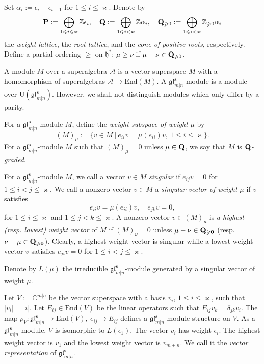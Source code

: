 \documentclass[11pt,reqno]{amsart}
\numberwithin{equation}{section}
\theoremstyle{definition}
\theoremstyle{remark}
\newcommand{\h}{\mathfrak{h}}
\newcommand{\End}{\mathrm{End}}
\newcommand{\bC}{\mathbb{C}}
\newcommand{\bZ}{\mathbb{Z}}
\newcommand{\gge}{\geqslant}
\newcommand{\lle}{\leqslant}
\newcommand{\glMN}{\mathfrak{gl}_{m|n}^{\bm s}}
\newcommand{\ka}{\varkappa}
\begin{document}
Set $\alpha_i:=\epsilon_i-\epsilon_{i+1}$ for $1\lle i \lle \ka$. Denote by
$$
{\bf P}:=\bigoplus_{1\lle i \lle \ka}\bZ \epsilon_i,\quad  {\bf Q}:=\bigoplus_{1\lle i < \ka}\bZ \alpha_i,\quad {\bf Q}_{\gge 0}:=\bigoplus_{1\lle i <\ka}\bZ_{\gge 0} \alpha_i$$ the \textit{weight lattice}, the \textit{root lattice}, and the \textit{cone of positive roots}, respectively. Define a partial ordering $\gge$ on $\h^*$: $\mu\gge \nu$ if $\mu-\nu\in {\bf Q}_{\gge 0}$.

A module $M$ over a superalgebra $\mathcal A$ is a vector superspace $M$ with a homomorphism of superalgebras $\mathcal A\to \End(M)$. A $\glMN$-module is a module over $\mathrm{U}(\glMN)$. However, we shall not distinguish modules which only differ by a parity.

For a $\glMN$-module $M$, define the \textit{weight subspace of weight} $\mu$ by
\begin{equation}\label{eq:uweight-space}
(M)_{\mu}:=\{v\in M\ \vert \ e_{ii}v=\mu(e_{ii})v,\ 1\lle i \lle \ka\}.
\end{equation}
For a $\glMN$-module $M$ such that $(M)_{\mu}=0$ unless $\mu\in\bf Q$, we say that $M$ is \textit{$\bf Q$-graded}.

For a $\glMN$-module $M$, we call a vector $v\in M$ \textit{singular} if $e_{ij}v=0$ for $1\lle i<j\lle \ka$. We call a nonzero vector $v\in M$ a \textit{singular vector of weight} $\mu$ if $v$ satisfies
\[
e_{ii}v=\mu(e_{ii})v,\quad e_{jk}v=0,
\]
for $1\lle i\lle \ka$ and $1\lle j< k\lle \ka$. A nonzero vector $v\in (M)_{\mu}$ is {\it a highest (resp. lowest) weight vector} of $M$ if $(M)_{\nu}= 0$ unless $\mu-\nu\in\bf Q_{\gge 0}$ (resp. $\nu-\mu\in\bf Q_{\gge 0}$). Clearly, a highest weight vector is singular while a lowest weight vector $v$ satisfies $e_{ji}v=0$ for $1\lle i< j\lle \ka$.


Denote by $L(\mu)$ the irreducible $\glMN$-module generated by a
singular vector of weight $\mu$.


Let $V:=\bC^{m\vert n}$ be the vector superspace with a basis $v_i$, $1\lle i \lle \ka$, such that $\vert v_i\vert =\vert i\vert $. Let $E_{ij}\in\End(V)$ be the linear operators such that $E_{ij}v_k=\delta_{jk}v_i$. The map $\rho_V:\glMN\to \End(V),\ e_{ij}\mapsto E_{ij}$ defines a $\glMN$-module structure on $V$. As a $\glMN$-module, $V$ is isomorphic to $L({\epsilon_1})$. The vector $v_i$ has weight $\epsilon_i$. The highest weight vector is $v_1$ and the lowest weight vector is $v_{m+n}$. We call it the \textit{vector representation} of $\glMN$.
\end{document}
